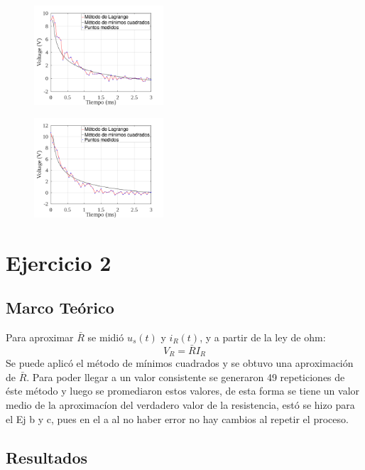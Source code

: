 \documentclass[letterpaper, 10 pt, conference]{ieeeconf}  %
\begin{document}
\begin{figure}[H]
\centering
\includegraphics[width=0.43\textwidth]{./plots/ej1-a-plot-1.png}
\label{fig:fig}
\end{figure}

\begin{figure}[H]
\centering
\includegraphics[width=0.43\textwidth]{./plots/ej1-a-plot-2.png}
\label{fig:fig}
\end{figure}

\section{Ejercicio 2}

\subsection{Marco Te\'orico}

Para aproximar $\bar{R}$ se midi\'o $u_{s}(t)$ y $i_{R}(t)$, y a partir de la ley de ohm:
    \[ V_{R} = \bar{R}I_{R} \] 
    Se puede aplic\'o el m\'etodo de m\'inimos cuadrados y se obtuvo una aproximaci\'on de $\bar{R}$.
    Para poder llegar a un valor consistente se generaron 49 repeticiones de \'este m\'etodo y luego se promediaron estos valores, de esta forma se tiene un valor medio de la aproximac\'ion del verdadero valor de la resistencia, est\'o se hizo para el Ej b y c, pues en el a al no haber error no hay cambios al repetir el proceso. 

    \subsection{Resultados}
\end{document}
